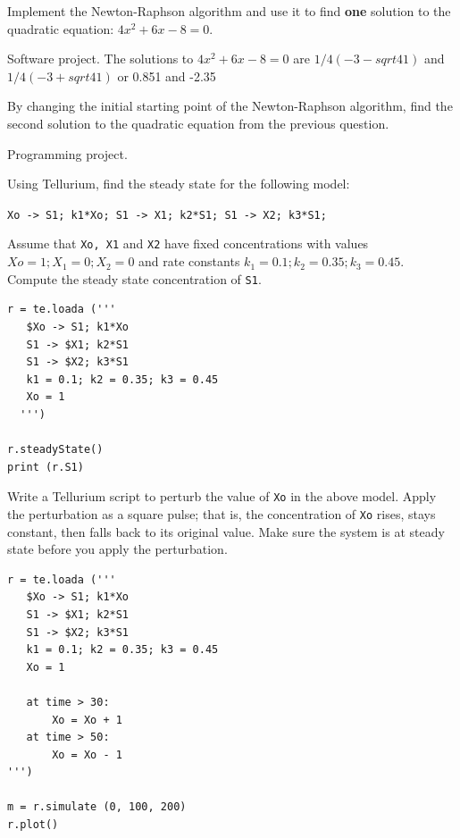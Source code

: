 \documentclass[12pt]{article}
\begin{document}
\begin{question}
Implement the Newton-Raphson algorithm and use it to find {\bf one} solution to the quadratic equation: $4 x^2 + 6 x - 8 = 0$.
\end{question}
\begin{solution}
Software project. The solutions to $4 x^2 + 6 x - 8 = 0$ are $1/4 (-3-sqrt{41})$ and $1/4 (-3+sqrt{41})$ or 0.851 and -2.35
\end{solution}



\begin{question}
By changing the initial starting point of the Newton-Raphson algorithm, find the second solution to the quadratic equation from the previous question.
\end{question}
\begin{solution}
Programming project.
\end{solution}



\begin{question}
Using Tellurium, find the steady state for the following model:

{\tt Xo -> S1; k1*Xo; S1 -> X1; k2*S1; S1 -> X2; k3*S1;}

Assume that {\tt Xo, X1} and {\tt X2} have fixed concentrations with values $Xo=1; X_1 = 0; X_2 = 0$ and rate constants $k_1 = 0.1; k_2 = 0.35; k_3 = 0.45$. Compute the steady state concentration of {\tt S1}.
\end{question}
\cprotEnv\begin{solution}
\begin{verbatim}
r = te.loada ('''
   $Xo -> S1; k1*Xo
   S1 -> $X1; k2*S1
   S1 -> $X2; k3*S1
   k1 = 0.1; k2 = 0.35; k3 = 0.45
   Xo = 1
  ''')

r.steadyState()
print (r.S1)
\end{verbatim}
\end{solution}



\begin{question}
Write a Tellurium script to perturb the value of {\tt Xo} in the above model. Apply the perturbation as a square pulse; that is, the concentration of {\tt Xo} rises, stays constant, then falls back to its original value. Make sure the system is at steady state before you apply the perturbation.
\end{question}
\cprotEnv\begin{solution}
\begin{verbatim}
r = te.loada ('''
   $Xo -> S1; k1*Xo
   S1 -> $X1; k2*S1
   S1 -> $X2; k3*S1
   k1 = 0.1; k2 = 0.35; k3 = 0.45
   Xo = 1

   at time > 30:
       Xo = Xo + 1
   at time > 50:
       Xo = Xo - 1
''')

m = r.simulate (0, 100, 200)
r.plot()
\end{verbatim}
\end{solution}
\end{document}
